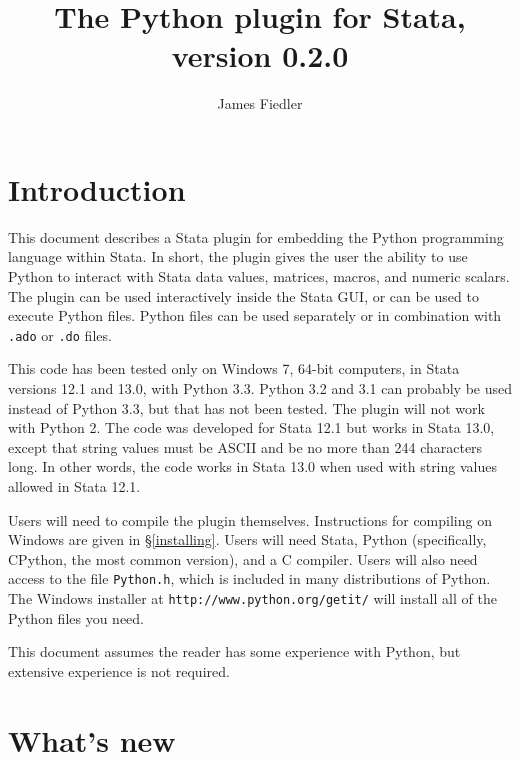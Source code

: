 \documentclass{article}
\title{The Python plugin for Stata, version 0.2.0}
\author{James Fiedler}
\date{}
\begin{document}
\maketitle
\tableofcontents

\section{Introduction}
		
This document describes a Stata plugin for embedding the Python programming language within Stata. In short, the plugin gives the user the ability to use Python to interact with Stata data values, matrices, macros, and numeric scalars. The plugin can be used interactively inside the Stata GUI, or can be used to execute Python files. Python files can be used separately or in combination with \lstinline{.ado} or \lstinline{.do} files.
		
This code has been tested only on Windows 7, 64-bit computers, in Stata versions 12.1 and 13.0, with Python 3.3. Python 3.2 and 3.1 can probably be used instead of Python 3.3, but that has not been tested. The plugin will not work with Python 2. The code was developed for Stata 12.1 but works in Stata 13.0, except that string values must be \textsc{ASCII} and be no more than 244 characters long. In other words, the code works in Stata 13.0 when used with string values allowed in Stata 12.1.
		
Users will need to compile the plugin themselves. Instructions for compiling on Windows are given in \S\ref{installing}. Users will need Stata, Python (specifically, CPython, the most common version), and a C compiler. Users will also need access to the file \lstinline{Python.h}, which is included in many distributions of Python. The Windows installer at \lstinline{http://www.python.org/getit/} will install all of the Python files you need. 
		
This document assumes the reader has some experience with Python, but extensive experience is not required.



\section{What's new}
\end{document}
